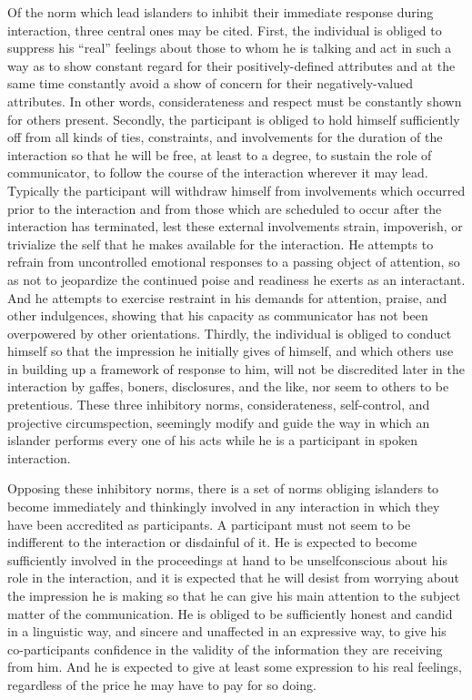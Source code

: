 \documentclass[twoside,symmetric,nobib,justified]{tufte-book}
\begin{document}
Of the norm which lead islanders to inhibit their immediate response
during interaction, three central ones may be cited. First, the
individual is obliged to suppress his ``real'' feelings about those to
whom he is talking and act in such a way as to show constant regard for
their positively-defined attributes and at the same time constantly
avoid a show of concern for their negatively-valued attributes. In other
words, considerateness and respect must be constantly shown for others
present. Secondly, the participant is obliged to hold himself
sufficiently off from all kinds of ties, constraints, and involvements
for the duration of the interaction so that he will be free, at least to
a degree, to sustain the role of communicator, to follow the course of
the interaction wherever it may lead. Typically the participant will
withdraw himself from involvements which occurred prior to the
interaction and from those which are scheduled to occur after the
interaction has terminated, lest these external involvements strain,
impoverish, or trivialize the self that he makes available for the
interaction. He attempts to refrain from uncontrolled emotional
responses to a passing object of attention, so as not to jeopardize the
continued poise and readiness he exerts as an interactant. And he
attempts to exercise restraint in his demands for attention, praise, and
other indulgences, showing that his capacity as communicator has not
been overpowered by other orientations. Thirdly, the individual is
obliged to conduct himself so that the impression he initially gives of
himself, and which others use in building up a framework of response to
him, will not be discredited later in the interaction by gaffes, boners,
disclosures, and the like, nor seem to others to be pretentious. These
three inhibitory norms, considerateness, self-control, and projective
circumspection, seemingly modify and guide the way in which an islander
performs every one of his acts while he is a participant in spoken
interaction.

\newpage Opposing these inhibitory norms, there is a set of norms obliging
islanders to become immediately and thinkingly involved in any
interaction in which they have been accredited as participants. A
participant must not seem to be indifferent to the interaction or
disdainful of it. He is expected to become sufficiently involved in the
proceedings at hand to be unselfconscious about his role in the
interaction, and it is expected that he will desist from worrying about
the impression he is making so that he can give his main attention to
the subject matter of the communication. He is obliged to be
sufficiently honest and candid in a linguistic way, and sincere and
unaffected in an expressive way, to give his co-participants confidence
in the validity of the information they are receiving from him. And he
is expected to give at least some expression to his real feelings,
regardless of the price he may have to pay for so doing.
\end{document}
